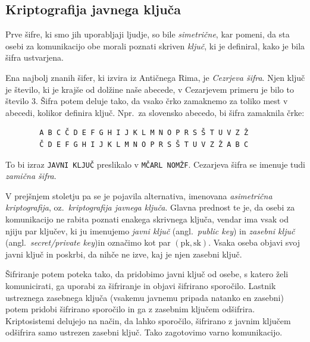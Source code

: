 \documentclass[isrm2, tisk]{fmfdelo}
\begin{document}
\subsection{Kriptografija javnega ključa}
Prve šifre, ki smo jih uporabljaji ljudje, so bile \textit{simetrične}, kar pomeni, da sta osebi 
za komunikacijo obe morali poznati skriven \textit{ključ}, ki je definiral, kako je bila šifra 
ustvarjena. 

\begin{primer}
    Ena najbolj znanih šifer, ki izvira iz Antičnega Rima, je \textit{Cezrjeva šifra}. Njen ključ 
    je število, ki je krajše od dolžine naše abecede, v Cezarjevem primeru je bilo to število $3$.
    Šifra potem deluje tako, da vsako črko zamaknemo za toliko mest v abecedi, kolikor definira 
    ključ. Npr.\ za slovensko abecedo, bi šifra zamaknila črke:
    \begin{verbatim}
        A B C Č D E F G H I J K L M N O P R S Š T U V Z Ž
        Č D E F G H I J K L M N O P R S Š T U V Z Ž A B C
    \end{verbatim}
    To bi izraz \texttt{JAVNI KLJUČ} preslikalo v \texttt{MČARL NOMŽF}. Cezarjeva šifra se imenuje 
    tudi \textit{zamična šifra}.
\end{primer}

V prejšnjem stoletju pa se je pojavila alternativa, imenovana \textit{asimetrična kriptografija}, oz.\
\textit{kriptografija javnega ključa}. Glavna prednost te je, da osebi za komunikacijo ne rabita 
poznati enakega skrivnega ključa, vendar ima vsak od njiju par ključev, ki ju imenujemo \textit{javni 
ključ} (angl.\ \textit{public key}) in \textit{zasebni ključ} (angl.\ \textit{secret/private key})in 
označimo kot par $(\text{pk}, \text{sk})$. Vsaka oseba objavi svoj javni ključ in poskrbi, da nihče 
ne izve, kaj je njen zasebni ključ. 

Šifriranje potem poteka tako, da pridobimo javni ključ od osebe, s katero želi komunicirati, ga uporabi
za šifriranje in objavi šifrirano sporočilo. Lastnik ustreznega zasebnega ključa (vsakemu javnemu pripada 
natanko en zasebni) potem pridobi šifrirano sporočilo in ga z zasebnim ključem odšifrira. Kriptosistemi 
delujejo na način, da lahko sporočilo, šifrirano z javnim ključem odšifrira samo ustrezen zasebni ključ. 
Tako zagotovimo varno komunikacijo. 
\end{document}

